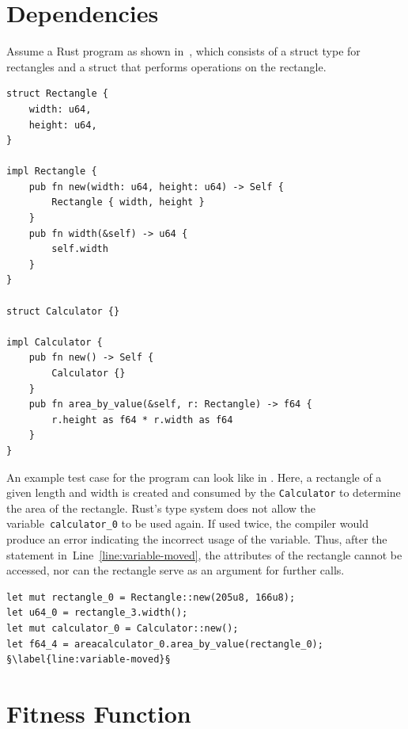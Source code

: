 \documentclass[paper=a4,%
  twoside,%
  BCOR4mm,%
  abstract=true,%
  toc=bibliography,%
  chapterprefix=true,%
  toc=bibliographynumbered,%
  open=right,%
  english,%
  pagesize=pdftex]{scrreprt}
\begin{document}

\section{Dependencies}
\label{sec:dependencies}
Assume a Rust program as shown in~, which consists of a struct type for rectangles and a struct that performs operations on the rectangle.
\begin{lstlisting}[style=boxed, caption={Rectangle data type}, label=lst:example-rust-program]
struct Rectangle {
    width: u64,
    height: u64,
}

impl Rectangle {
    pub fn new(width: u64, height: u64) -> Self {
        Rectangle { width, height }
    }
    pub fn width(&self) -> u64 {
        self.width
    }
}

struct Calculator {}

impl Calculator {
    pub fn new() -> Self {
        Calculator {}
    }
    pub fn area_by_value(&self, r: Rectangle) -> f64 {
        r.height as f64 * r.width as f64
    }
}
\end{lstlisting}

An example test case for the program can look like in . Here, a rectangle of a given length and width is created and consumed by the \texttt{Calculator} to determine the area of the rectangle. Rust's type system does not allow the variable~\texttt{calculator\string_0} to be used again. If used twice, the compiler would produce an error indicating the incorrect usage of the variable. Thus, after the statement in~Line~\ref{line:variable-moved}, the attributes of the rectangle cannot be accessed, nor can the rectangle serve as an argument for further calls.

\begin{lstlisting}[style=boxed, escapechar=§, caption={An example test case generated for the program in \Cref{lst:example-rust-program}}, label=lst:example-testcase]
let mut rectangle_0 = Rectangle::new(205u8, 166u8);
let u64_0 = rectangle_3.width();
let mut calculator_0 = Calculator::new();
let f64_4 = areacalculator_0.area_by_value(rectangle_0); §\label{line:variable-moved}§
\end{lstlisting}


\section{Fitness Function}
\label{sec:fitness-function}
\end{document}
